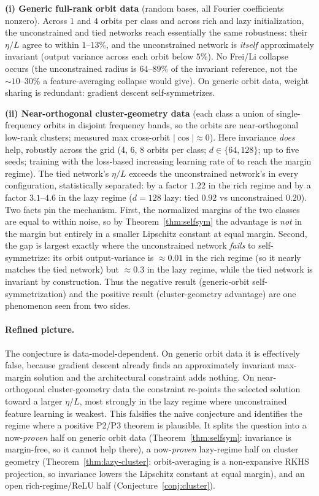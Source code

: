 \documentclass[11pt]{article}
\theoremstyle{plain}
\theoremstyle{definition}
\theoremstyle{remark}
\begin{document}
\textbf{(i) Generic full-rank orbit data} (random bases, all Fourier coefficients nonzero).  Across $1$ and $4$ orbits per class and across rich and lazy initialization, the unconstrained and tied networks reach essentially the same robustness: their $\eta/L$ agree to within $1$--$13\%$, and the unconstrained network is \emph{itself} approximately invariant (output variance across each orbit below $5\%$).  No Frei/Li collapse occurs (the unconstrained radius is $64$--$89\%$ of the invariant reference, not the $\sim10$--$30\%$ a feature-averaging collapse would give).  On generic orbit data, weight sharing is redundant: gradient descent self-symmetrizes.

\textbf{(ii) Near-orthogonal cluster-geometry data} (each class a union of single-frequency orbits in disjoint frequency bands, so the orbits are near-orthogonal low-rank clusters; measured max cross-orbit $|\cos|\approx0$).  Here invariance \emph{does} help, robustly across the grid (4, 6, 8 orbits per class; $d\in\{64,128\}$; up to five seeds; training with the loss-based increasing learning rate of \citet{Lyu2020} to reach the margin regime).  The tied network's $\eta/L$ exceeds the unconstrained network's in every configuration, statistically separated: by a factor $1.22$ in the rich regime and by a factor $3.1$--$4.6$ in the lazy regime ($d{=}128$ lazy: tied $0.92$ vs unconstrained $0.20$).  Two facts pin the mechanism.  First, the normalized margins of the two classes are equal to within noise, so by Theorem~\ref{thm:selfsym} the advantage is \emph{not} in the margin but entirely in a smaller Lipschitz constant at equal margin.  Second, the gap is largest exactly where the unconstrained network \emph{fails} to self-symmetrize: its orbit output-variance is $\approx0.01$ in the rich regime (so it nearly matches the tied network) but $\approx0.3$ in the lazy regime, while the tied network is invariant by construction.  Thus the negative result (generic-orbit self-symmetrization) and the positive result (cluster-geometry advantage) are one phenomenon seen from two sides.

\paragraph{Refined picture.}  The conjecture is data-model-dependent.  On generic orbit data it is effectively false, because gradient descent already finds an approximately invariant max-margin solution and the architectural constraint adds nothing.  On near-orthogonal cluster-geometry data the constraint re-points the selected solution toward a larger $\eta/L$, most strongly in the lazy regime where unconstrained feature learning is weakest.  This falsifies the naive conjecture and identifies the regime where a positive P2/P3 theorem is plausible.  It splits the question into a now-\emph{proven} half on generic orbit data (Theorem~\ref{thm:selfsym}: invariance is margin-free, so it cannot help there), a now-\emph{proven} lazy-regime half on cluster geometry (Theorem~\ref{thm:lazy-cluster}: orbit-averaging is a non-expansive RKHS projection, so invariance lowers the Lipschitz constant at equal margin), and an open rich-regime/ReLU half (Conjecture~\ref{conj:cluster}).
\end{document}
